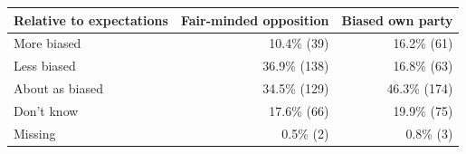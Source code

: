 \begin{tabular}{lrr}
\toprule
Relative to expectations & Fair-minded opposition & Biased own party \\
\midrule
More biased & 10.4\% (39) & 16.2\% (61) \\
Less biased & 36.9\% (138) & 16.8\% (63) \\
About as biased & 34.5\% (129) & 46.3\% (174) \\
Don't know & 17.6\% (66) & 19.9\% (75) \\
Missing & 0.5\% (2) & 0.8\% (3) \\
\bottomrule
\end{tabular}
